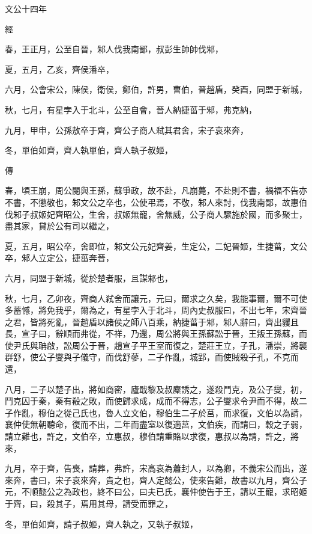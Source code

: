 \documentclass[fontset = none]{ctexart}
\begin{document}
文公十四年


經



春，王正月，公至自晉，邾人伐我南鄙，叔彭生帥帥伐邾，

夏，五月，乙亥，齊侯潘卒，

六月，公會宋公，陳侯，衛侯，鄭伯，許男，曹伯，晉趙盾，癸酉，同盟于新城，

秋，七月，有星孛入于北斗，公至自會，晉人納捷菑于邾，弗克納，

九月，甲申，公孫敖卒于齊，齊公子商人弒其君舍，宋子哀來奔，

冬，單伯如齊，齊人執單伯，齊人執子叔姬，

傳



春，頃王崩，周公閱與王孫，蘇爭政，故不赴，凡崩薨，不赴則不書，禍福不告亦不書，不懲敬也，邾文公之卒也，公使弔焉，不敬，邾人來討，伐我南鄙，故惠伯伐邾子叔姬妃齊昭公，生舍，叔姬無寵，舍無威，公子商人驟施於國，而多聚士，盡其家，貸於公有司以繼之，

夏，五月，昭公卒，舍即位，邾文公元妃齊姜，生定公，二妃晉姬，生捷菑，文公卒，邾人立定公，捷菑奔晉，

六月，同盟于新城，從於楚者服，且謀邾也，

秋，七月，乙卯夜，齊商人弒舍而讓元，元曰，爾求之久矣，我能事爾，爾不可使多蓄憾，將免我乎，爾為之，有星孛入于北斗，周內史叔服曰，不出七年，宋齊晉之君，皆將死亂，晉趙盾以諸侯之師八百乘，納捷菑于邾，邾人辭曰，齊出貜且長，宣子曰，辭順而弗從，不祥，乃還，周公將與王孫蘇訟于晉，王叛王孫蘇，而使尹氏與聃啟，訟周公于晉，趙宣子平王室而復之，楚莊王立，子孔，潘崇，將襲群舒，使公子燮與子儀守，而伐舒蓼，二子作亂，城郢，而使賊殺子孔，不克而還，

八月，二子以楚子出，將如商密，廬戢黎及叔麇誘之，遂殺鬥克，及公子燮，初，鬥克囚于秦，秦有殽之敗，而使歸求成，成而不得志，公子燮求令尹而不得，故二子作亂，穆伯之從己氏也，魯人立文伯，穆伯生二子於莒，而求復，文伯以為請，襄仲使無朝聽命，復而不出，二年而盡室以復適莒，文伯疾，而請曰，穀之子弱，請立難也，許之，文伯卒，立惠叔，穆伯請重賂以求復，惠叔以為請，許之，將來，

九月，卒于齊，告喪，請葬，弗許，宋高哀為蕭封人，以為卿，不義宋公而出，遂來奔，書曰，宋子哀來奔，貴之也，齊人定懿公，使來告難，故書以九月，齊公子元，不順懿公之為政也，終不曰公，曰夫已氏，襄仲使告于王，請以王寵，求昭姬于齊，曰，殺其子，焉用其母，請受而罪之，

冬，單伯如齊，請子叔姬，齊人執之，又執子叔姬，
\end{document}
